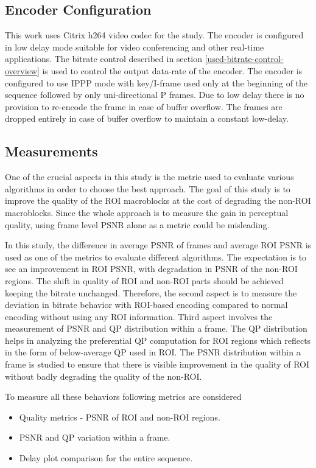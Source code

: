 \documentclass[11pt]{article} %
\begin{document}
\subsection{Encoder Configuration}      
This work uses Citrix h264 video codec for the study. The encoder is configured in low delay mode suitable for video conferencing and other real-time applications. The bitrate control described in section \ref{used-bitrate-control-overview} is used to control the output data-rate of the encoder. The encoder is configured to use IPPP mode with key/I-frame used only at the beginning of the sequence followed by only uni-directional P frames. Due to low delay there is no provision to re-encode the frame in case of buffer overflow. The frames are dropped entirely in case of buffer overflow to maintain a constant low-delay.

\subsection{Measurements}
One of the crucial aspects in this study is the metric used to evaluate various algorithms in order to choose the best approach. The goal of this study is to improve the quality of the ROI macroblocks at the cost of degrading the non-ROI macroblocks. Since the whole approach is to measure the gain in perceptual quality, using frame level PSNR alone as a metric could be misleading. 

In this study, the difference in average PSNR of frames and average ROI PSNR is used as one of the metrics to evaluate different algorithms. The expectation is to see an improvement in ROI PSNR, with degradation in PSNR of the non-ROI regions. The shift in quality of ROI and non-ROI parts should be achieved keeping the bitrate unchanged. Therefore, the second aspect is to measure the deviation in bitrate behavior with ROI-based encoding compared to normal encoding without using any ROI information. Third aspect involves the measurement of PSNR and QP distribution within a frame. The QP distribution helps in analyzing the preferential QP computation for ROI regions which reflects in the form of below-average QP used in ROI. The PSNR distribution within a frame is studied to ensure that there is visible improvement in the quality of ROI without badly degrading the quality of the non-ROI. 

To measure all these behaviors following metrics are considered
\begin{itemize}  
\item Quality metrics - PSNR of ROI and non-ROI regions.
\item PSNR and QP variation within a frame.
\item Delay plot comparison for the entire sequence.
\end{itemize}
\end{document}
